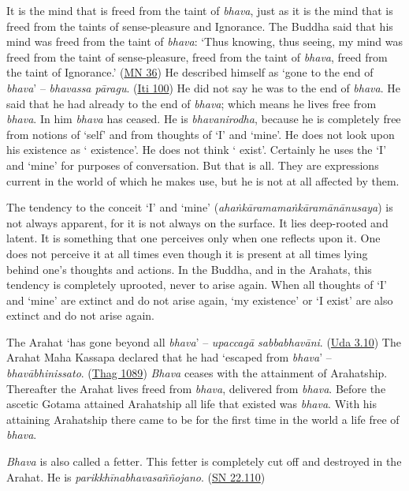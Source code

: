 It is the mind that is freed from the taint of \emph{bhava}, just as it is the mind that is freed from the taints of sense-pleasure and Ignorance. The Buddha said that his mind was freed from the taint of \emph{bhava}: `Thus knowing, thus seeing, my mind was freed from the taint of sense-pleasure, freed from the taint of \emph{bhava}, freed from the taint of Ignorance.' (\href{https://suttacentral.net/mn36/en/bodhi}{MN 36}) He described himself as `gone to the end of \emph{bhava}' -- \emph{bhavassa pāragu}. (\href{https://suttacentral.net/iti100/en/sujato}{Iti 100}) He did not say he was  to the end of \emph{bhava}. He said that he had already  to the end of \emph{bhava}; which means he lives free from \emph{bhava}. In him \emph{bhava} has ceased. He is \emph{bhavanirodha}, because he is completely free from notions of `self' and from thoughts of `I' and `mine'. He does not look upon his existence as ` existence'. He does not think ` exist'. Certainly he uses the  `I' and `mine' for purposes of conversation. But that is all. They are expressions current in the world of which he makes use, but he is not at all affected by them.

The tendency to the conceit `I' and `mine' (\emph{ahaṅkāramamaṅkāramānānusaya}) is not always apparent, for it is not always on the surface. It lies deep-rooted and latent. It is something that one perceives only when one reflects upon it. One does not perceive it at all times even though it is present at all times lying behind one's thoughts and actions. In the Buddha, and in the Arahats, this tendency is completely uprooted, never to arise again. When all thoughts of `I' and `mine' are extinct and do not arise again, `my existence' or `I exist' are also extinct and do not arise again.

The Arahat `has gone beyond all \emph{bhava}' -- \emph{upaccagā sabbabhavāni}. (\href{https://suttacentral.net/ud3.10/en/sujato}{Uda 3.10}) The Arahat Maha Kassapa declared that he had `escaped from \emph{bhava}' -- \emph{bhavābhinissato}. (\href{https://suttacentral.net/thag18.1/en/sujato}{Thag 1089}) \emph{Bhava} ceases with the attainment of Arahatship. Thereafter the Arahat lives freed from \emph{bhava}, delivered from \emph{bhava}. Before the ascetic Gotama attained Arahatship all life that existed was \emph{bhava}. With his attaining Arahatship there came to be for the first time in the world a life free of \emph{bhava}.

\emph{Bhava} is also called a fetter. This fetter is completely cut off and destroyed in the Arahat. He is \emph{parikkhīnabhavasaññojano}. (\href{https://suttacentral.net/sn22.110/en/sujato}{SN 22.110})

